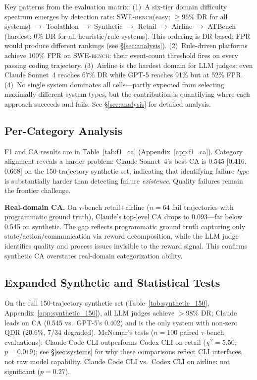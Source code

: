 \documentclass[11pt]{article}
\newcommand{\taubench}{$\tau$-bench\xspace}
\newcommand{\swebench}{\textsc{SWE-bench}\xspace}
\begin{document}
Key patterns from the evaluation matrix: (1)~A six-tier domain difficulty
spectrum emerges by detection rate: \swebench (easy; $\geq$96\% DR for
all systems) $\to$ Toolathlon $\to$ Synthetic $\to$ Retail $\to$ Airline
$\to$ ATBench (hardest; 0\% DR for all heuristic/rule systems). This
ordering is DR-based; FPR would produce different rankings (see
\S\ref{sec:analysis}). (2)~Rule-driven platforms achieve 100\%
FPR on \swebench: their event-count threshold fires on every passing
coding trajectory. (3)~Airline is the hardest domain for LLM judges: even
Claude Sonnet~4 reaches 67\% DR while GPT-5 reaches 91\% but at 52\% FPR. (4)~No single system dominates all
cells---partly expected from selecting maximally different system types,
but the contribution is quantifying where each approach succeeds and
fails.
See \S\ref{sec:analysis} for detailed analysis.

\subsection{Per-Category Analysis}

F1 and CA results are in Table~\ref{tab:f1_ca}
(Appendix~\ref{app:f1_ca}). Category alignment reveals a harder problem:
Claude Sonnet~4's best CA is 0.545 {\scriptsize [0.416, 0.668]} on the
150-trajectory synthetic set, indicating that identifying failure
\emph{type} is substantially harder than detecting failure
\emph{existence}. Quality failures remain the frontier challenge.

\textbf{Real-domain CA.} On \taubench retail+airline ($n = 64$ fail
trajectories with programmatic ground truth), Claude's top-level CA
drops to 0.093---far below 0.545 on synthetic. The gap reflects
programmatic ground truth capturing only state/action/communication via
reward decomposition, while the LLM judge identifies quality and process
issues invisible to the reward signal. This confirms synthetic CA
overstates real-domain categorization ability.

\subsection{Expanded Synthetic and Statistical Tests}

On the full 150-trajectory synthetic set (Table~\ref{tab:synthetic_150},
Appendix~\ref{app:synthetic_150}), all LLM judges achieve $>$98\% DR;
Claude leads on CA (0.545 vs.\ GPT-5's 0.402) and is the only system
with non-zero QDR (20.6\%, 7/34 degraded).
McNemar's tests ($n = 100$ paired \taubench evaluations): Claude Code
CLI outperforms Codex CLI on retail ($\chi^2 = 5.50$, $p = 0.019$);
see \S\ref{sec:systems} for why these comparisons reflect CLI
interfaces, not raw model capability.
Claude Code CLI vs.\ Codex CLI on airline: not significant ($p = 0.27$).
\end{document}
